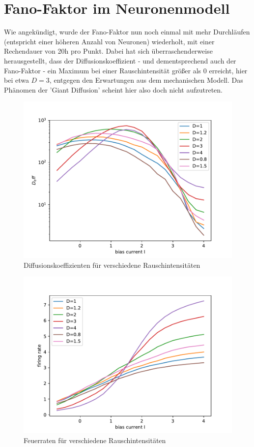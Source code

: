 \documentclass[12pt,a4paper]{article}
\begin{document}
\section{Fano-Faktor im Neuronenmodell}
Wie angekündigt, wurde der Fano-Faktor nun noch einmal mit mehr Durchläufen (entspricht einer höheren Anzahl von Neuronen) wiederholt, mit einer Rechendauer von 20h pro Punkt. Dabei hat sich überraschenderweise herausgestellt, dass der Diffusionskoeffizient - und dementsprechend auch der Fano-Faktor - ein Maximum bei einer Rauschintensität größer als 0 erreicht, hier bei etwa $D=3$, entgegen den Erwartungen aus dem mechanischen Modell. Das Phänomen der 'Giant Diffusion' scheint hier also doch nicht aufzutreten.
\begin{figure}[H]
	\centering
	\includegraphics[scale=0.9]{dneurpm.pdf} 
	\caption{Diffusionskoeffizienten für verschiedene Rauschintensitäten}
	\label{dnp}
\end{figure} 
\begin{figure}[H]
	\centering
	\includegraphics[scale=0.9]{gneurpm.pdf} 
	\caption{Feuerraten für verschiedene Rauschintensitäten}
	\label{gnp}
\end{figure} 
\end{document}
